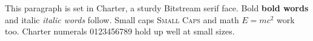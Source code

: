 \documentclass{article}
\begin{document}
This paragraph is set in Charter, a sturdy Bitstream serif face.
Bold \textbf{bold words} and italic \textit{italic words} follow.
Small caps \textsc{Small Caps} and math $E = mc^2$ work too.
Charter numerals 0123456789 hold up well at small sizes.
\end{document}
